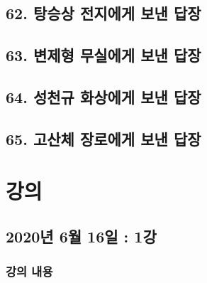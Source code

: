 \documentclass[12pt, a4paper, oneside]{book}
\let\stdsection\section
\renewcommand\section{\newpage\stdsection}
\begin{document}
 	\section{62. 탕승상 전지에게 보낸 답장 }

%
 	\section{63. 변제형 무실에게 보낸 답장 }

%
 	\section{64. 성천규 화상에게 보낸 답장 }

%
 	\section{65. 고산체 장로에게 보낸 답장 }












	\chapter{강의 }
	\noptcrule

	\newpage	
	\minitoc


%
	\section{2020년 6월 16일 : 1강}

		\subsection{강의 내용}
\end{document}
